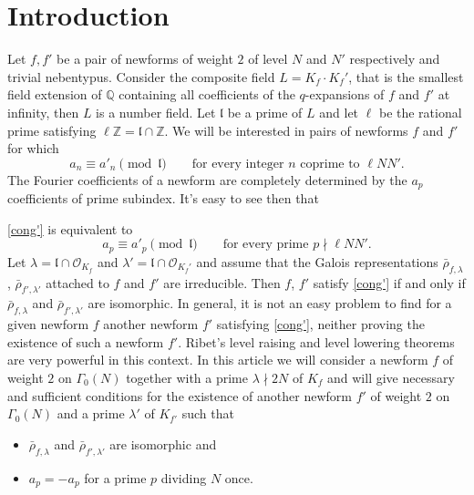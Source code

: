 \documentclass[12pt,reqno]{amsart}
\theoremstyle{plain}
\theoremstyle{definition}
\begin{document}
\section{Introduction}
\label{intro}
Let $f,f'$ be a pair of newforms of weight $2$ of level $N$ and $N'$ respectively and trivial nebentypus. Consider the composite field $L=K_f \cdot K_f'$, that is the smallest field extension of $\mathbb Q$ containing all coefficients of the $q$-expansions of $f$ and $f'$ at infinity, then $L$ is a number field. Let $\mathfrak l$ be a prime of $L$ and let $\ell$ be the rational prime satisfying $\ell\mathbb Z=\mathfrak l\cap \mathbb Z$. We will be interested in pairs of newforms $f$ and $f'$ for which
\begin{equation}\label{cong'}
a_n \equiv a'_n \pmod {\mathfrak l}\qquad \text{for every integer $n$ coprime to $\ell NN'$}.
\end{equation}
The Fourier coefficients of a newform are completely determined by the $a_p$ coefficients of prime subindex. It's easy to see then that 

 \eqref{cong'} is equivalent to 
\begin{equation}\label{cong}
a_p \equiv a'_p \pmod {\mathfrak l}\qquad \text{for every prime $p\nmid \ell NN'$}.
\end{equation}
Let $\lambda=\mathfrak l \cap \mathcal O_{K_f}$ and $\lambda'=\mathfrak l \cap \mathcal O_{K_f'}$ and assume that the Galois representations $\bar\rho_{f,\lambda}$, $\bar\rho_{f',\lambda'}$ attached to $f$ and $f'$ are irreducible. Then $f$, $f'$ satisfy \eqref{cong'} if and only if $\bar\rho_{f,\lambda}$ and $\bar\rho_{f',\lambda'}$ are isomorphic. In general, it is not an easy problem to  find for a given newform $f$ another newform $f'$ satisfying \eqref{cong'}, neither proving the existence of such a newform $f'$. Ribet's level raising \cite{RibetRai} and level lowering \cite{RibetLow} theorems are very powerful in this context. In this article we will consider a newform $f$ of weight $2$ on $\Gamma_0(N)$ together with a prime $\lambda\nmid 2N$ of $K_f$ and will give necessary and sufficient conditions for the existence of another newform $f'$ of weight $2$ on $\Gamma_0(N)$ and a prime $\lambda'$ of $K_{f'}$ such that  
\begin{itemize}
\item $\bar\rho_{f,\lambda}$ and $\bar\rho_{f',\lambda'}$ are isomorphic and
\item $a_p=-a_p$ for a prime $p$ dividing $N$ once.
\end{itemize}
\end{document}
